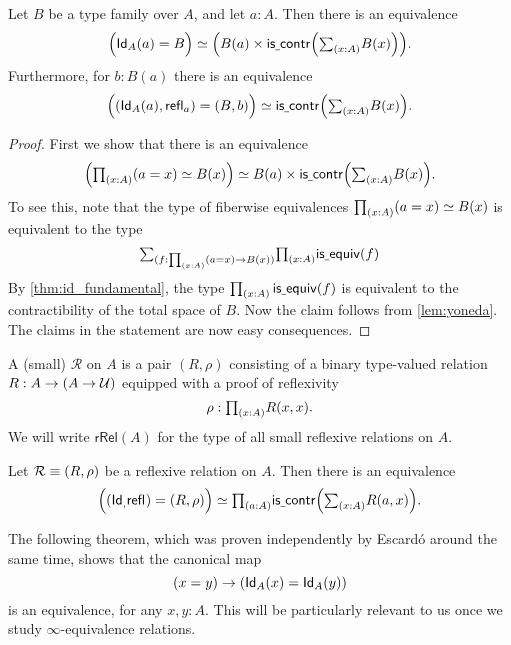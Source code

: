 \begin{cor}
Let $B$ be a type family over $A$, and let $a:A$. Then there is an equivalence
\begin{equation*}
\eqv{\Big(\idtypevar{A}(a)=B\Big)}{\Big(B(a)\times\iscontr\Big(\sm{x:A}B(x)\Big)\Big)}.
\end{equation*}
Furthermore, for $b:B(a)$ there is an equivalence
\begin{equation*}
\eqv{\Big((\idtypevar{A}(a),\refl{a})=(B,b)\Big)}{\iscontr\Big(\sm{x:A}B(x)\Big)}.
\end{equation*}
\end{cor}

\begin{proof}
First we show that there is an equivalence
\begin{equation*}
\eqv{\Big(\prd{x:A} (a=x)\eqvsym B(x)\Big)}{B(a)\times\iscontr\Big(\sm{x:A}B(x)\Big)}.
\end{equation*}
To see this, note that the type of fiberwise equivalences $\prd{x:A} (a=x)\eqvsym B(x)$ is equivalent to the type
\begin{equation*}
\sm{f:\prd{x:A}(a=x)\to B(x)}\prd{x:A}\isequiv(f)
\end{equation*}
By \cref{thm:id_fundamental}, the type $\prd{x:A}\isequiv(f)$ is equivalent to the contractibility of the total space of $B$. Now the claim follows from \cref{lem:yoneda}. The claims in the statement are now easy consequences.
\end{proof}

\begin{defn}
A (small)  $\mathcal{R}$ on $A$ is a pair $(R,\rho)$ consisting of a binary type-valued relation $R:A\to (A\to \mathcal{U})$ equipped with a proof of reflexivity
\begin{equation*}
\rho : \prd{x:A}R(x,x).
\end{equation*}
We will write $\mathsf{rRel}(A)$ for the type of all small reflexive relations on $A$.
\end{defn}

\begin{cor}\label{cor:yoneda_rel}
Let $\mathcal{R}\equiv (R,\rho)$ be a reflexive relation on $A$.
Then there is an equivalence
\begin{equation*}
\eqv{\Big((\idtypevar,\refl{})=(R,\rho)\Big)}{\prd{a:A}\iscontr\Big(\sm{x:A}R(a,x)\Big)}.
\end{equation*}
\end{cor}

The following theorem, which was proven independently by Escardó \cite{Escardo2016} around the same time, shows that the canonical map
\begin{equation*}
(x=y)\to (\mathsf{Id}_{A}(x)=\mathsf{Id}_{A}(y))
\end{equation*}
is an equivalence, for any $x,y:A$. This will be particularly relevant to us once we study $\infty$-equivalence relations.

